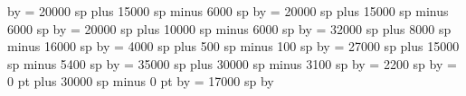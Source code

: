 {\multiply\spacearoundsmallbar by \grefactor %
%
\spacearoundminor = 20000 sp plus 15000 sp minus 6000 sp%
\multiply\spacearoundminor by \grefactor %
%
\spacearoundmaior = 20000 sp plus 15000 sp minus 6000 sp%
\multiply\spacearoundmaior by \grefactor %
%
\spacearoundfinalis = 20000 sp plus 10000 sp minus 6000 sp%
\multiply\spacearoundfinalis by \grefactor %
%
\spacebeforefinalfinalis= 32000 sp plus 8000 sp minus 16000 sp%
\multiply\spacebeforefinalfinalis by \grefactor %
%
\spacearoundclefbars= 4000 sp plus 500 sp minus 100 sp%
\multiply\spacearoundclefbars by \grefactor %
%
\textbartextspace = 27000 sp plus 15000 sp minus 5400 sp%
\multiply\textbartextspace by \grefactor %
%
\notebarspace = 35000 sp plus 30000 sp minus 3100 sp%
\multiply\notebarspace by \grefactor %
%
\maximumspacewithoutdash = 2200 sp%
\multiply\maximumspacewithoutdash by \grefactor %
%
\afterclefnospace = 0 pt plus 30000 sp minus 0 pt%
\multiply\afterclefnospace by \grefactor %
%
\additionallineswidth = 17000 sp%
\multiply\additionallineswidth by \grefactor %
%
\relax %
}
